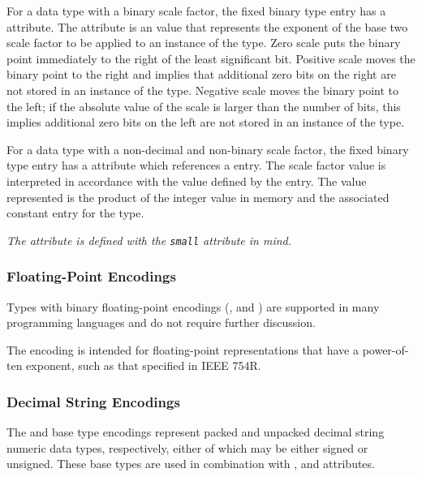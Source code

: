 \hypertarget{chap:DWATbinaryscalebinaryscalefactorforfixedpointtype}{}
For a data type with a binary scale factor, the fixed
binary type entry has a \DWATbinaryscaleNAME{} attribute. 
The \DWATbinaryscaleDEFN{} attribute 
is an  value
that represents the exponent of the base two scale factor to
be applied to an instance of the type.  Zero scale puts the
binary point immediately to the right of the least significant
bit. Positive scale moves the binary point to the right and
implies that additional zero bits on the right are not stored
in an instance of the type. Negative scale moves the binary
point to the left; if the absolute value of the scale is
larger than the number of bits, this implies additional zero
bits on the left are not stored in an instance of the type.

For 
\hypertarget{chap:DWATsmallscalefactorforfixedpointtype}{}
a data type with a non-decimal and non-binary scale factor,
the fixed binary type entry has a \DWATsmallDEFN{} attribute which
 references a 
\DWTAGconstant{} entry. The scale factor value
is interpreted in accordance with the value defined by the
\DWTAGconstant{} entry. The value represented is the product
of the integer value in memory and the associated constant
entry for the type.

\textit{The \DWATsmall{} attribute is defined with the 
 \texttt{small} attribute in mind.}

\subsubsection{Floating-Point Encodings}
\label{chap:floatingpointencodings}
Types with binary floating-point encodings 
(\DWATEfloat{}, \DWATEcomplexfloat{} and \DWATEimaginaryfloat{})
are supported in many
programming languages and do not require further discussion.

The \DWATEdecimalfloat{} encoding is intended for
floating-point representations that have a power-of-ten
exponent, such as that specified in IEEE 754R.

\subsubsection{Decimal String Encodings}
\label{chap:decimalstringencodings}
The \DWATEpackeddecimalDEFN{} and \DWATEnumericstringDEFN{} 
base type encodings
represent packed and unpacked decimal string numeric data
types, respectively, either of which may be either 
signed
or 
unsigned. These 
base types are used in combination with
\DWATdecimalsign, 
\DWATdigitcount{} and 
\DWATdecimalscale{}
attributes.

